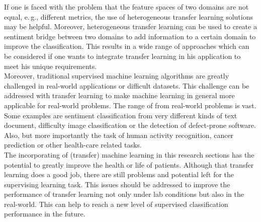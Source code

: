 If one is faced with the problem that the feature spaces of two domains are not equal, e.\,g., different metrics, the use of heterogeneous transfer learning solutions may be helpful.
Moreover, heterogeneous transfer learning can be used to create a sentiment bridge between two domains to add information to a certain domain to improve the classification.
This results in a wide range of approaches which can be considered if one wants to integrate transfer learning in his application to meet his unique requirements.\\
Moreover, traditional supervised machine learning algorithms are greatly challenged in real-world applications or difficult datasets.\cite{Pan.2010}
This challenge can be addressed with transfer learning to make machine learning in general more applicable for real-world problems.
The range of from real-world problems is vast.
Some examples are sentiment classification from very different kinds of text document, difficulty image classification or the detection of defect-prone software.\cite{Weiss.2016}
Also, but more importantly the task of human activity recognition, cancer prediction or other health-care related tasks.\cite{Burlina.2017}\cite{Kourou.2015}\\
The incorporating of (transfer) machine learning in this research sections has the potential to greatly improve the health or life of patients.
Although that transfer learning does a good job, there are still problems and potential left for the supervising learning task.
This issues should be addressed to improve the performance of transfer learning not only under lab conditions but also in the real-world.
This can help to reach a new level of supervised classification performance in the future.
